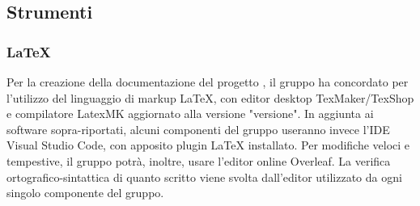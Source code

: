 \subsection{Strumenti}
\subsubsection{\LaTeX{}}
Per la creazione della documentazione del progetto {\NomeProgetto}, il gruppo {\Gruppo} ha concordato per l’utilizzo del linguaggio di markup \LaTeX{}, con editor desktop TexMaker/TexShop e compilatore LatexMK aggiornato alla versione "versione".
In aggiunta ai software sopra-riportati, alcuni componenti del gruppo useranno invece l'IDE Visual Studio Code, con apposito plugin \LaTeX{} installato.
Per modifiche veloci e tempestive, il gruppo potrà, inoltre, usare l'editor online Overleaf.
La verifica ortografico-sintattica di quanto scritto viene svolta dall’editor utilizzato da ogni singolo componente del gruppo.
